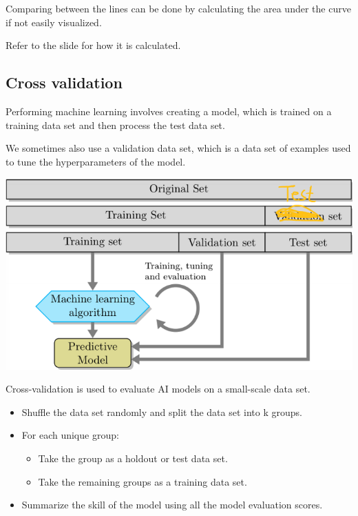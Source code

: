 \documentclass[letterpaper,12pt]{article}
\begin{document}
Comparing between the lines can be done by calculating the area under the curve
if not easily visualized.

Refer to the slide for how it is calculated.

\subsection{Cross validation}
Performing machine learning involves creating a model, which is trained on a
training data set and then process the test data set.

We sometimes also use a validation data set, which is a data set of examples
used to tune the hyperparameters of the model.

\includegraphics{./Image/Data split.png}

Cross-validation is used to evaluate AI models on a small-scale data set.
\begin{itemize}
    \item Shuffle the data set randomly and split the data set into k groups.
    \item For each unique group:
          \begin{itemize}
              \item Take the group as a holdout or test data set.
              \item Take the remaining groups as a training data set.
          \end{itemize}
    \item Summarize the skill of the model using all the model evaluation scores.
\end{itemize}
\end{document}
